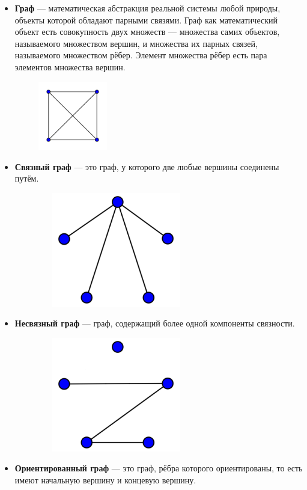 \documentclass[12pt]{article}
\begin{document}
\begin{itemize}
    \item \textbf{Граф} —  математическая абстракция реальной системы любой природы, объекты которой обладают парными связями. Граф как математический объект есть совокупность двух множеств — множества самих объектов, называемого множеством вершин, и множества их парных связей, называемого множеством рёбер. Элемент множества рёбер есть пара элементов множества вершин.
    
    \includegraphics[width=0.4\textwidth, height=3cm, keepaspectratio]{g.png}
    
    \item \textbf{Связный граф} — это граф, у которого две любые вершины соединены путём.
    
     \includegraphics[width=0.7\textwidth, height=5cm, keepaspectratio]{sg.png}

     \item \textbf{Несвязный граф} — граф, содержащий более одной компоненты связности.
    
     \includegraphics[width=0.7\textwidth, height=5cm, keepaspectratio]{nsg.png}

      \item \textbf{Ориентированный граф} — это граф, рёбра которого ориентированы, то есть имеют начальную вершину и концевую вершину.
    

\end{itemize}
\end{document}
